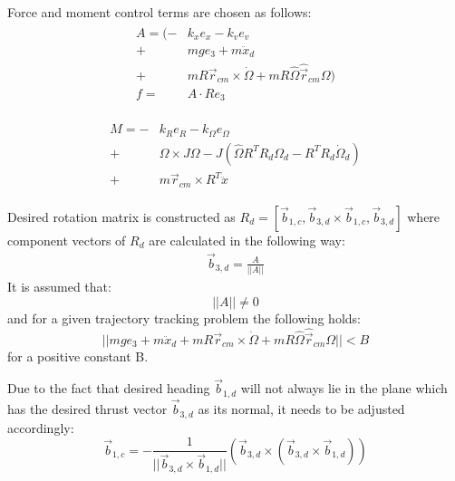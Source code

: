 Force and moment control terms are chosen as follows:
\begin{align}
	\begin{split}
		A = (-& k_x e_x - k_v e_v \\
		+& mge_3 + m\ddot{x}_d \\
		+& mR\vec{r}_{cm}  \times \dot{\Omega} + mR\hat{\Omega}\hat{\vec{r}}_{cm}\Omega ) \\
		f =& A \cdot Re_3 \label{force_control}
	\end{split}
\end{align}

\begin{align}
	\begin{split}
		M = -& k_R e_R - k_\Omega e_\Omega \\
			+& \Omega \times J\Omega - J(\hat{\Omega}R^TR_d\Omega_d - R^TR_d\dot{\Omega}_d) \\
			+& m\vec{r}_{cm} \times R^T \ddot{x}  \label{moment_control}
	\end{split}
\end{align}

Desired rotation matrix is constructed as 
$R_d = [\vec{b}_{1,c}, \vec{b}_{3,d} \times \vec{b}_{1,c}, \vec{b}_{3,d}]$ where component vectors of $R_d$ are calculated in the following way:
\begin{gather}
	\vec{b}_{3,d} = \frac{A}{|| A ||}
\end{gather}
\noindent It is assumed that:
\begin{equation}
	|| A || \neq 0 \label{condition1}
\end{equation}
and for a given trajectory tracking problem the following holds:
\begin{equation}
	|| mge_3 + m\ddot{x}_d 
	+ mR\vec{r}_{cm}  \times \dot{\Omega} + mR\hat{\Omega}\hat{\vec{r}}_{cm}\Omega|| < B \label{condition2}
\end{equation}
for a positive constant B.

Due to the fact that desired heading $\vec{b}_{1,d}$ will not always lie in the plane which has the desired thrust vector $\vec{b}_{3,d}$ as its normal, it needs to be adjusted accordingly:
\begin{equation}
	\vec{b}_{1,c} = -\frac{1}{||\vec{b}_{3,d} \times \vec{b}_{1,d}||}(\vec{b}_{3,d} \times (\vec{b}_{3,d} \times \vec{b}_{1,d}))
\end{equation}

